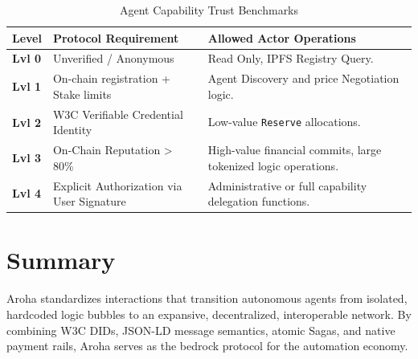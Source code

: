 \documentclass[11pt,a4paper]{article}
\begin{document}
\begin{table}[h]
    \centering
    \renewcommand{\arraystretch}{1.3}
    \begin{tabularx}{\textwidth}{@{} >{\bfseries}p{1.8cm} p{6cm} X @{}}
        \toprule
        Level & Protocol Requirement & Allowed Actor Operations \\
        \midrule
        Lvl 0 & Unverified / Anonymous & Read Only, IPFS Registry Query. \\
        Lvl 1 & On-chain registration + Stake limits & Agent Discovery and price Negotiation logic. \\
        Lvl 2 & W3C Verifiable Credential Identity & Low-value \texttt{Reserve} allocations. \\
        Lvl 3 & On-Chain Reputation > 80\% & High-value financial commits, large tokenized logic operations. \\
        Lvl 4 & Explicit Authorization via User Signature & Administrative or full capability delegation functions. \\
        \bottomrule
    \end{tabularx}
    \caption{Agent Capability Trust Benchmarks}
\end{table}

\section{Summary}
Aroha standardizes interactions that transition autonomous agents from isolated, hardcoded logic bubbles to an expansive, decentralized, interoperable network. By combining W3C DIDs, JSON-LD message semantics, atomic Sagas, and native payment rails, Aroha serves as the bedrock protocol for the automation economy.
\end{document}
